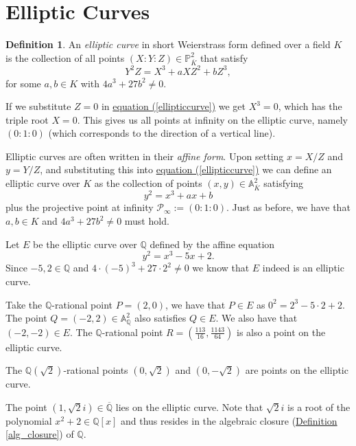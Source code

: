 \documentclass[openany, a4paper, 10pt]{book}
\theoremstyle{plain}
\theoremstyle{plain}
\theoremstyle{plain}
\theoremstyle{definition}
\newtheorem{definition}[theorem]{Definition}
\theoremstyle{plain}
\theoremstyle{definition}
\theoremstyle{remark}
\renewcommand{\eqref}[1]{\hyperref[#1]{equation (\ref{#1})}}
\newcommand{\defref}[1]{\hyperref[#1]{Definition \ref{#1}}}
\begin{document}
\section{Elliptic Curves}\label{sec:curves}
\begin{definition}\label{hom_curve}
    An \textit{elliptic curve} in short Weierstrass form defined over a field $K$ is the collection of all points $(X:Y:Z) \in \mathbb P^2_{\overline K}$ that satisfy
    \begin{equation}\label{ellipticcurve}
        Y^2 Z = X^3 + aXZ^2 + bZ^3,
    \end{equation}
    for some $a,b \in K$ with $4a^3 + 27b^2 \neq 0$.
\end{definition}

If we substitute $Z=0$ in \eqref{ellipticcurve} we get $X^3 = 0$, which has the triple root $X = 0$.
This gives us all points at infinity on the elliptic curve, namely $(0:1:0)$
(which corresponds to the direction of a vertical line).

Elliptic curves are often written in their \textit{affine form}.
Upon setting $x = X/Z$ and $y = Y/Z$, and substituting this into \eqref{ellipticcurve} we can define an elliptic curve over $K$ as the collection of points $(x,y) \in \mathbb A^2_{\overline K}$ satisfying
\begin{equation*}
    y^2 = x^3 + ax + b
\end{equation*}
plus the projective point at infinity $\mathcal P_\infty := (0 : 1 : 0)$.
Just as before, we have that $a,b \in K$ and $4a^3 + 27b^2 \neq 0$ must hold.

\begin{examplebox}
    Let $E$ be the elliptic curve over $\mathbb Q$ defined by the affine equation
    \begin{equation*}
        y^2=x^3-5x+2.
    \end{equation*}
    Since $-5,2 \in \mathbb Q$ and $4\cdot (-5)^3 + 27\cdot 2^2 \neq 0$ we know that $E$ indeed is an elliptic curve.

    Take the $\mathbb Q$-rational point $P=(2, 0)$, we have that $P\in E$ as $0^2 = 2^3-5\cdot 2+2$.
    The point $Q = (-2, 2) \in \mathbb A^2_{\mathbb Q}$ also satisfies $Q \in E$.
    We also have that $(-2, -2) \in E$.
    The $\mathbb Q$-rational point $R = (\frac{113}{16}, \frac{1143}{64})$ is also a point on the elliptic curve.

    The $\mathbb Q(\sqrt{2})$-rational points $(0, \sqrt{2})$ and $(0, -\sqrt{2})$ are points on the elliptic curve.

    The point $(1, \sqrt{2}i) \in \overline{\mathbb Q}$ lies on the elliptic curve.
    Note that $\sqrt{2}i$ is a root of the polynomial $x^2+2 \in \mathbb Q[x]$ and thus resides in the algebraic closure (\defref{alg_closure}) of $\mathbb Q$.
\end{examplebox}
\end{document}
